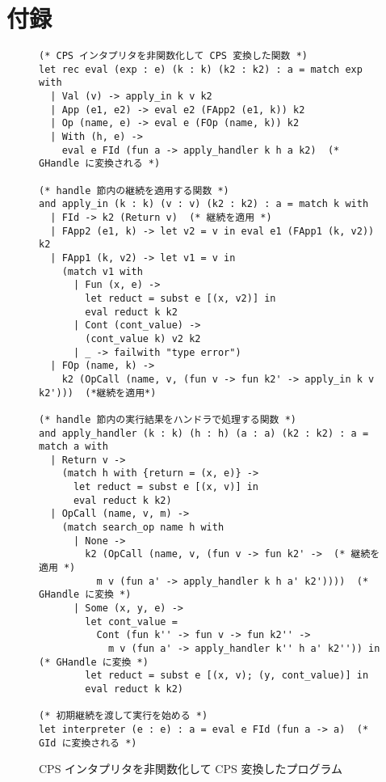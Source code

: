 \appendix
\section{付録}

\begin{figure}
\begin{spacing}{0.9}
\begin{verbatim}
(* CPS インタプリタを非関数化して CPS 変換した関数 *)
let rec eval (exp : e) (k : k) (k2 : k2) : a = match exp with
  | Val (v) -> apply_in k v k2
  | App (e1, e2) -> eval e2 (FApp2 (e1, k)) k2
  | Op (name, e) -> eval e (FOp (name, k)) k2
  | With (h, e) ->
    eval e FId (fun a -> apply_handler k h a k2)  (* GHandle に変換される *)

(* handle 節内の継続を適用する関数 *)
and apply_in (k : k) (v : v) (k2 : k2) : a = match k with
  | FId -> k2 (Return v)  (* 継続を適用 *)
  | FApp2 (e1, k) -> let v2 = v in eval e1 (FApp1 (k, v2)) k2
  | FApp1 (k, v2) -> let v1 = v in
    (match v1 with
      | Fun (x, e) ->
        let reduct = subst e [(x, v2)] in
        eval reduct k k2
      | Cont (cont_value) ->
        (cont_value k) v2 k2
      | _ -> failwith "type error")
  | FOp (name, k) ->
    k2 (OpCall (name, v, (fun v -> fun k2' -> apply_in k v k2')))  (*継続を適用*)

(* handle 節内の実行結果をハンドラで処理する関数 *)
and apply_handler (k : k) (h : h) (a : a) (k2 : k2) : a = match a with
  | Return v ->
    (match h with {return = (x, e)} ->
      let reduct = subst e [(x, v)] in
      eval reduct k k2)
  | OpCall (name, v, m) ->
    (match search_op name h with
      | None ->
        k2 (OpCall (name, v, (fun v -> fun k2' ->  (* 継続を適用 *)
          m v (fun a' -> apply_handler k h a' k2'))))  (* GHandle に変換 *)
      | Some (x, y, e) ->
        let cont_value =
          Cont (fun k'' -> fun v -> fun k2'' ->
            m v (fun a' -> apply_handler k'' h a' k2'')) in  (* GHandle に変換 *)
        let reduct = subst e [(x, v); (y, cont_value)] in
        eval reduct k k2)

(* 初期継続を渡して実行を始める *)
let interpreter (e : e) : a = eval e FId (fun a -> a)  (* GId に変換される *)
\end{verbatim}
\caption{CPS インタプリタを非関数化して CPS 変換したプログラム}
\label{figure:3cps}
\end{spacing}
\end{figure}

